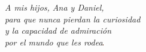 

\vspace*{3cm} %

\begin{flushright}
	\emph{A mis hijos, Ana y Daniel,\\
		para que nunca pierdan la curiosidad\\
		y la capacidad de admiración\\
		por el mundo que les rodea\includegraphics[width=0.003\textwidth]{./figuras/ana_daniel_enero_2024.jpg}}
\end{flushright}



